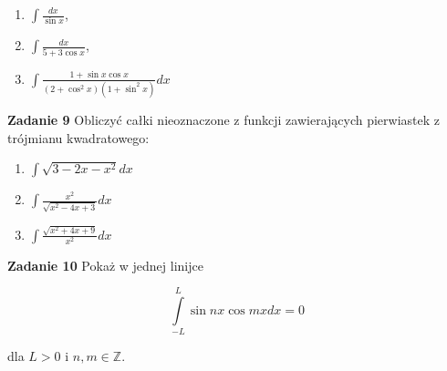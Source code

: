 \documentclass[a4paper,11pt]{article}
\begin{document}
\begin{multicols}{3}
    \begin{enumerate}
        \item $\int \frac{dx}{\sin x}$,
        \item $\int \frac{dx}{5+3\cos x}$,
        \item $\int \frac{1+\sin x \cos x}{(2+\cos^2 x)(1+\sin^2 x)} dx$
    \end{enumerate}
\end{multicols}

\textbf{Zadanie 9} Obliczyć całki nieoznaczone z funkcji zawierających pierwiastek z trójmianu kwadratowego:

\begin{multicols}{3}
    \begin{enumerate}
        \item $\int \sqrt{3-2x-x^2} dx$
        \item $\int \frac{x^2}{\sqrt{x^2-4x + 3}} dx$
        \item $\int \frac{\sqrt{x^2 + 4x + 9}}{x^2} dx$
    \end{enumerate}
\end{multicols}

\textbf{Zadanie 10} Pokaż w jednej linijce 

$$\int \limits_{-L}^L \sin nx \cos mx dx = 0$$

dla $L>0$ i $n,m \in \mathbb{Z}$.
\end{document}
